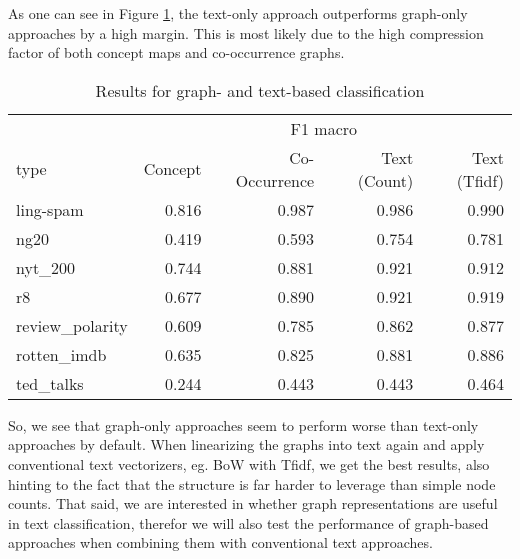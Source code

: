 As one can see in Figure \ref{fig:results_cmap_vs_text}, the text-only approach outperforms graph-only approaches by a high margin.
This is most likely due to the high compression factor of both concept maps and co-occurrence graphs.

\begin{table}[htb!]
    \centering
    \begin{tabular}{lrrrr}
        \toprule
         & \multicolumn{4}{c}{F1 macro} \\
        type &  Concept &  Co-Occurrence & Text (Count) & Text (Tfidf) \\
        \midrule
        ling-spam       & 0.816 & 0.987 & 0.986 & 0.990 \\
        ng20            & 0.419 & 0.593 & 0.754 & 0.781 \\
        nyt\_200         & 0.744 & 0.881 & 0.921 & 0.912 \\
        r8              & 0.677 & 0.890 & 0.921 & 0.919 \\
        review\_polarity & 0.609 & 0.785 & 0.862 & 0.877 \\
        rotten\_imdb     & 0.635 & 0.825 & 0.881 & 0.886 \\
        ted\_talks       & 0.244 & 0.443 & 0.443 & 0.464 \\
        \bottomrule
    \end{tabular}
    \caption[Results: Concept Maps vs. Text]{Results for graph- and text-based classification}
    \label{fig:results_cmap_vs_text}
\end{table}

So, we see that graph-only approaches seem to perform worse than text-only approaches by default.
When linearizing the graphs into text again and apply conventional text vectorizers, eg. BoW with Tfidf, we get the best results, also hinting to the fact that the structure is far harder to leverage than simple node counts.
That said, we are interested in whether graph representations are useful in text classification, therefor we will also test the performance of graph-based approaches when combining them with conventional text approaches.

